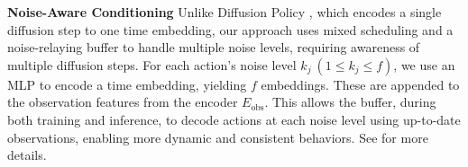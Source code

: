\textbf{Noise-Aware Conditioning}
Unlike Diffusion Policy \citep{chi2023diffusion}, which encodes a single diffusion step to one time embedding, our approach uses mixed scheduling and a noise-relaying buffer to handle multiple noise levels, requiring awareness of multiple diffusion steps. For each action’s noise level \(k_j \ (1 \leq k_j \leq f)\), we use an MLP to encode a time embedding, yielding \(f\) embeddings. These are appended to the observation features from the encoder \(E_{\mathrm{obs}}\). This allows the buffer, during both training and inference, to decode actions at each noise level using up-to-date observations, enabling more dynamic and consistent behaviors. See  for more details.
